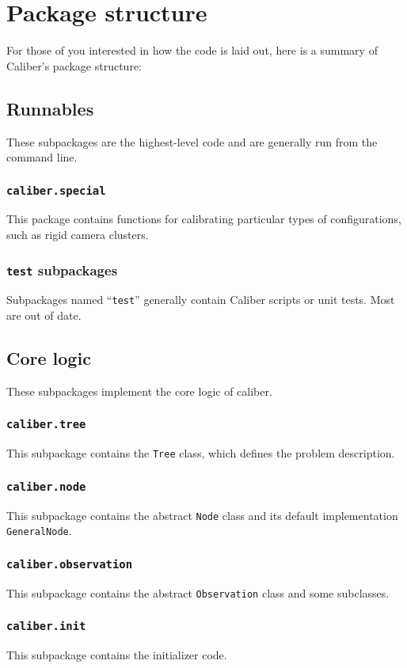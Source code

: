 \section{Package structure}
For those of you interested in how the code is laid out, here is a summary of Caliber's package structure:

\subsection{Runnables}
These subpackages are the highest-level code and are generally run from the command line.
\subsubsection{\texttt{caliber.special}}
This package contains functions for calibrating particular types of configurations, such as rigid camera clusters.
\subsubsection{\texttt{test} subpackages}
Subpackages named ``\texttt{test}'' generally contain Caliber scripts or unit tests. Most are out of date.

\subsection{Core logic}
These subpackages implement the core logic of caliber.
\subsubsection{\texttt{caliber.tree}}
This subpackage contains the \texttt{Tree} class, which defines the problem description.
\subsubsection{\texttt{caliber.node}}
This subpackage contains the abstract \texttt{Node} class and its default implementation \texttt{GeneralNode}.
\subsubsection{\texttt{caliber.observation}}
This subpackage contains the abstract \texttt{Observation} class and some subclasses.
\subsubsection{\texttt{caliber.init}}
This subpackage contains the initializer code.
